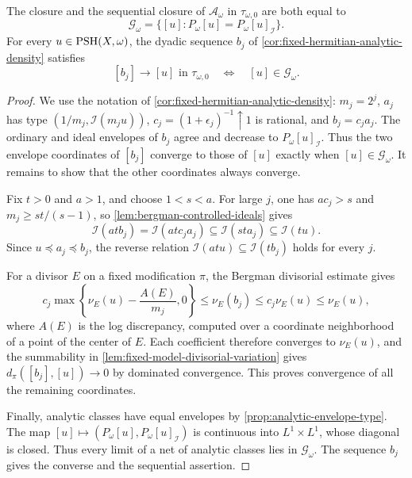 \begin{theorem}\label{thm:ordinary-topology-analytic-closure}
The closure and the sequential closure of $\mathcal A_\omega$ in $\tau_{\omega,0}$ are both equal to
\begin{equation}\label{eq:ordinary-topology-analytic-closure}
 \mathcal G_\omega=\{[u]:P_\omega[u]=P_\omega[u]_{\mathcal I}\}.
\end{equation}
For every $u\in\mathrm{PSH}(X,\omega)$, the dyadic sequence $b_j$ of \cref{cor:fixed-hermitian-analytic-density} satisfies
\[
 [b_j]\longrightarrow[u]\text{ in }\tau_{\omega,0}
 \quad\Longleftrightarrow\quad [u]\in\mathcal G_\omega.
\]
\end{theorem}
\begin{proof}
We use the notation of \cref{cor:fixed-hermitian-analytic-density}: $m_j=2^j$, $a_j$ has type $(1/m_j,\mathcal I(m_ju))$, $c_j=(1+\epsilon_j)^{-1}\uparrow1$ is rational, and $b_j=c_ja_j$. The ordinary and ideal envelopes of $b_j$ agree and decrease to $P_\omega[u]_{\mathcal I}$. Thus the two envelope coordinates of $[b_j]$ converge to those of $[u]$ exactly when $[u]\in\mathcal G_\omega$. It remains to show that the other coordinates always converge.

Fix $t>0$ and $a>1$, and choose $1<s<a$. For large $j$, one has $ac_j>s$ and $m_j\geq st/(s-1)$, so \cref{lem:bergman-controlled-ideals} gives
\[
 \mathcal I(atb_j)=\mathcal I(atc_ja_j)
 \subseteq\mathcal I(sta_j)\subseteq\mathcal I(tu).
\]
Since $u\preceq a_j\preceq b_j$, the reverse relation $\mathcal I(atu)\subseteq\mathcal I(tb_j)$ holds for every $j$.

For a divisor $E$ on a fixed modification $\pi$, the Bergman divisorial estimate gives
\[
 c_j\max\left\{\nu_E(u)-\frac{A(E)}{m_j},0\right\}
 \leq\nu_E(b_j)\leq c_j\nu_E(u)\leq\nu_E(u),
\]
where $A(E)$ is the log discrepancy, computed over a coordinate neighborhood of a point of the center of $E$. Each coefficient therefore converges to $\nu_E(u)$, and the summability in \cref{lem:fixed-model-divisorial-variation} gives $d_\pi([b_j],[u])\to0$ by dominated convergence. This proves convergence of all the remaining coordinates.

Finally, analytic classes have equal envelopes by \cref{prop:analytic-envelope-type}. The map $[u]\mapsto(P_\omega[u],P_\omega[u]_{\mathcal I})$ is continuous into $L^1\times L^1$, whose diagonal is closed. Thus every limit of a net of analytic classes lies in $\mathcal G_\omega$. The sequence $b_j$ gives the converse and the sequential assertion.
\end{proof}

